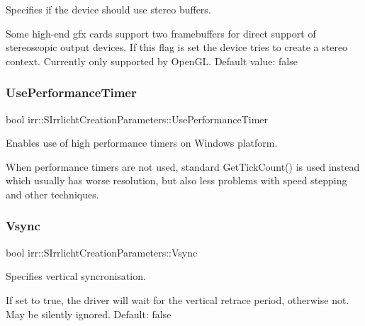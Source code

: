 Specifies if the device should use stereo buffers. 

Some high-\/end gfx cards support two framebuffers for direct support of stereoscopic output devices. If this flag is set the device tries to create a stereo context. Currently only supported by Open\+GL. Default value\+: false \mbox{\label{structirr_1_1SIrrlichtCreationParameters_a5bb2ea5e72eb07a049b1b7c707f405ef}} 
\subsubsection{\texorpdfstring{Use\+Performance\+Timer}{UsePerformanceTimer}}
{\footnotesize\ttfamily bool irr\+::\+S\+Irrlicht\+Creation\+Parameters\+::\+Use\+Performance\+Timer}



Enables use of high performance timers on Windows platform. 

When performance timers are not used, standard Get\+Tick\+Count() is used instead which usually has worse resolution, but also less problems with speed stepping and other techniques. \mbox{\label{structirr_1_1SIrrlichtCreationParameters_a33b07682f12db0d2c2c3a7bf74f64387}} 
\subsubsection{\texorpdfstring{Vsync}{Vsync}}
{\footnotesize\ttfamily bool irr\+::\+S\+Irrlicht\+Creation\+Parameters\+::\+Vsync}



Specifies vertical syncronisation. 

If set to true, the driver will wait for the vertical retrace period, otherwise not. May be silently ignored. Default\+: false \mbox{\label{structirr_1_1SIrrlichtCreationParameters_a0a26cda9a187b312dc4df26c4e9c52f1}} 
